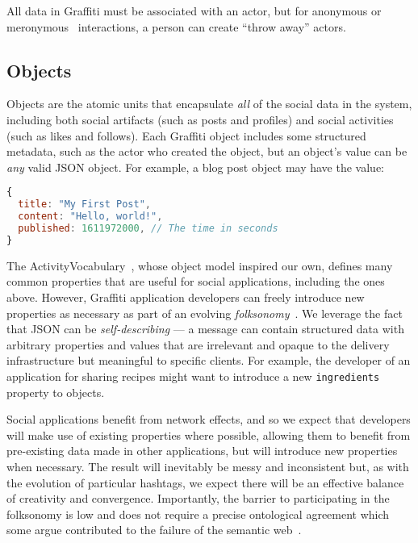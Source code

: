 All data in Graffiti must be associated with an actor, but
for anonymous or meronymous~\cite{meronymous} interactions,
a person can create ``throw away'' actors.

\subsection{Objects}
\label{concepts:objects}

Objects are the atomic units that encapsulate \emph{all}
of the social data in the system, including
both social artifacts (such as posts and profiles) and social activities (such as likes and follows).
Each Graffiti object includes some structured metadata,
such as the actor who created the object,
but an object's value can be \emph{any} valid JSON object.
For example, a blog post object may have the value:

\begin{lstlisting}[language=javascript]
{
  title: "My First Post",
  content: "Hello, world!",
  published: 1611972000, // The time in seconds
}
\end{lstlisting}

The ActivityVocabulary~\cite{activityvocab},
whose object model inspired our own,
defines many common properties that are useful for social applications, including
the ones above.
However, Graffiti application developers can freely introduce new properties as necessary
as part of an evolving \emph{folksonomy}~\cite{folksonomy}.
We leverage the fact that JSON can be \emph{self-describing}
--- a message can contain structured data with arbitrary properties and
values that are irrelevant and opaque to the delivery infrastructure but
meaningful to specific clients.
For example, the developer of an application for sharing recipes might want to introduce a new
\texttt{ingredients} property to objects.

Social applications
benefit from network effects, and so we expect that developers will make use of
existing properties where possible, allowing them to benefit from pre-existing data
made in other applications, but will introduce new properties when necessary.
The result will inevitably be messy and inconsistent but, as with the evolution of
particular hashtags, we expect there will be an effective balance of creativity and convergence.
Importantly, the barrier to participating in the folksonomy is low
and does not require a precise ontological agreement
which some argue contributed to the failure of the semantic web~\cite{semanticwebtwodecades}.

